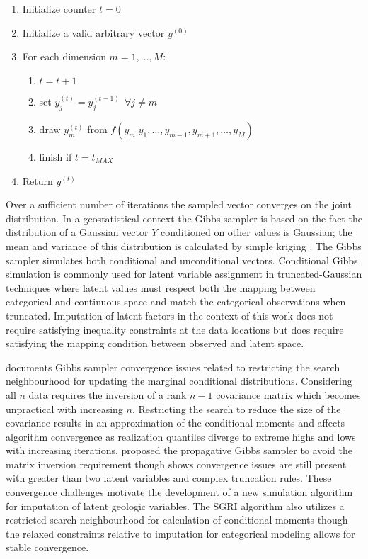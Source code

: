 \begin{enumerate}[noitemsep]
    \item Initialize counter $t=0$
    \item Initialize a valid arbitrary vector $y^{(0)}$
    \item For each dimension $m=1,\dots,M$:
          \begin{enumerate}[noitemsep]
              \item $t=t+1$
              \item set $y^{(t)}_{j} = y^{(t-1)}_{j} \ \ \forall j \neq m$
              \item draw $y^{(t)}_{m}$ from  $f(y_{m}|y_{1},\dots,y_{m-1},y_{m+1},\dots,y_{M})$
              \item finish if $t=t_{MAX}$
          \end{enumerate}
    \item Return $y^{(t)}$
\end{enumerate}

Over a sufficient number of iterations the sampled vector converges on the joint distribution. In a geostatistical context the Gibbs sampler is based on the fact the distribution of a Gaussian vector $Y$ conditioned on other values is Gaussian; the mean and variance of this distribution is calculated by simple kriging \citep{emery2014simulating}. The Gibbs sampler simulates both conditional and unconditional vectors. Conditional Gibbs simulation is commonly used for latent variable assignment in truncated-Gaussian techniques \citep{armstrong2011plurigaussian,silva2017multiple} where latent values must respect both the mapping between categorical and continuous space and match the categorical observations when truncated. Imputation of latent factors in the context of this work does not require satisfying inequality constraints at the data locations but does require satisfying the mapping condition between observed and latent space.

\cite{silva2018enhanced} documents Gibbs sampler convergence issues related to restricting the search neighbourhood for updating the marginal conditional distributions. Considering all $n$ data requires the inversion of a rank $n-1$ covariance matrix which becomes unpractical with increasing $n$. Restricting the search to reduce the size of the covariance results in an approximation of the conditional moments and affects algorithm convergence \citep{emery2014simulating, lauzon2020sequential} as realization quantiles diverge to extreme highs and lows with increasing iterations. \cite{lantuejoul2012simulation} proposed the propagative Gibbs sampler to avoid the matrix inversion requirement though \cite{silva2018enhanced} shows convergence issues are still present with greater than two latent variables and complex truncation rules. These convergence challenges motivate the development of a new simulation algorithm for imputation of latent geologic variables. The \gls{SGRI} algorithm also utilizes a restricted search neighbourhood for calculation of conditional moments though the relaxed constraints relative to imputation for categorical modeling allows for stable convergence.


